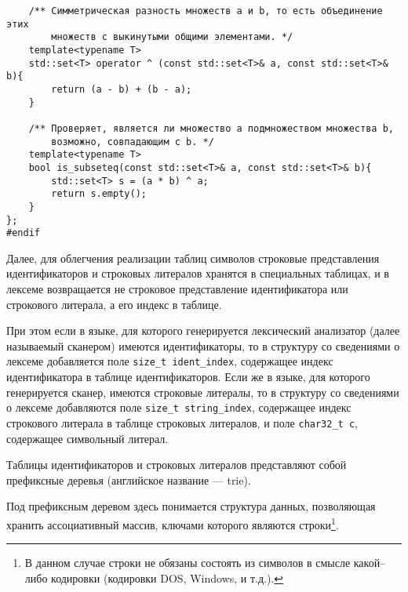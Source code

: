 \documentclass[10pt]{report}
\begin{document}
\begin{verbatim}
    /** Симметрическая разность множеств a и b, то есть объединение этих
        множеств с выкинутыми общими элементами. */
    template<typename T>
    std::set<T> operator ^ (const std::set<T>& a, const std::set<T>& b){
        return (a - b) + (b - a);
    }

    /** Проверяет, является ли множество a подмножеством множества b,
        возможно, совпадающим с b. */
    template<typename T>
    bool is_subseteq(const std::set<T>& a, const std::set<T>& b){
        std::set<T> s = (a * b) ^ a;
        return s.empty();
    }
};
#endif
\end{verbatim}

Далее, для облегчения реализации таблиц символов строковые представления идентификаторов и строковых литералов хранятся в специальных таблицах, и в лексеме возвращается не строковое представление идентификатора или строкового литерала, а его индекс в таблице.

При этом если в языке, для которого генерируется лексический анализатор (далее называемый сканером) имеются идентификаторы, то в структуру со сведениями о лексеме добавляется поле \texttt{size_t ident_index}, содержащее индекс идентификатора в таблице идентификаторов. Если же в языке, для которого генерируется сканер, имеются строковые литералы, то в структуру со сведениями о лексеме добавляются поле \texttt{size_t string_index}, содержащее индекс строкового литерала в таблице строковых литералов, и поле \texttt{char32_t c}, содержащее символьный литерал.

Таблицы идентификаторов и строковых литералов представляют собой префиксные деревья (английское название --- trie).

Под префиксным деревом здесь понимается структура данных, позволяющая хранить ассоциативный массив, ключами которого являются строки\footnote{В данном случае строки не обязаны состоять из символов в смысле какой--либо кодировки (кодировки DOS, Windows, и т.д.).}.
\end{document}

